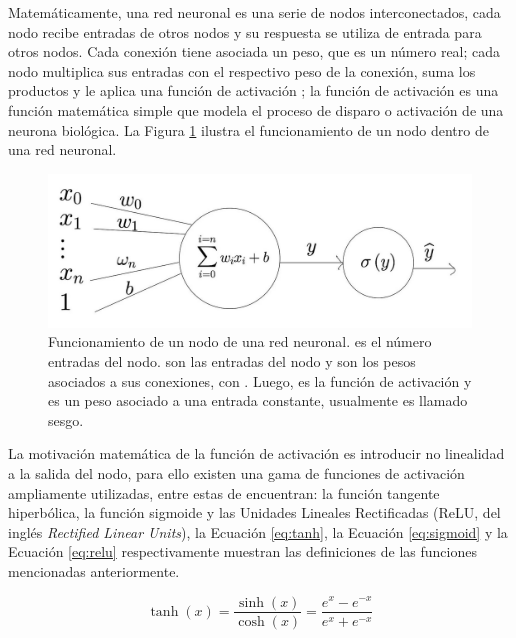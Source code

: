 Matemáticamente, una red neuronal es una serie de nodos interconectados, cada nodo recibe entradas de otros nodos y su respuesta se utiliza de entrada para otros nodos. Cada conexión tiene asociada un peso, que es un número real; cada nodo multiplica sus entradas con el respectivo peso de la conexión, suma los productos y le aplica una función de activación \cite{Gurney1997}; la función de activación es una función matemática simple que modela el proceso de disparo o activación de una neurona biológica. La Figura \ref{fig:nn-single-node} ilustra el funcionamiento de un nodo dentro de una red neuronal.

\begin{figure}[H]
    \centering
    \includegraphics[scale=0.25]{partes/img/perceptron.jpg}
    \caption[Funcionamiento de un nodo de una red neuronal.]{
        Funcionamiento de un nodo de una red neuronal\footnotemark.  es el número entradas del nodo.  son las entradas del nodo y  son los pesos asociados a sus conexiones, con . Luego, \jim{\sigma} es la función de activación y  es un peso asociado a una entrada constante, usualmente es llamado sesgo.
    } 
    \label{fig:nn-single-node}
\end{figure}

La motivación matemática de la función de activación es introducir no linealidad a la salida del nodo, para ello existen una gama de funciones de activación ampliamente utilizadas, entre estas de encuentran: la función tangente hiperbólica, la función sigmoide y las Unidades Lineales Rectificadas (ReLU, del inglés \textit{Rectified Linear Units}), la Ecuación \ref{eq:tanh}, la Ecuación \ref{eq:sigmoid} y la Ecuación \ref{eq:relu} respectivamente muestran las definiciones de las funciones mencionadas anteriormente.

\begin{equation}
    \label{eq:tanh}
    \tanh(x) = \frac{\sinh(x)}{\cosh(x)} = \frac{e^x - e^{-x}}{e^x + e^{-x}}
\end{equation}

